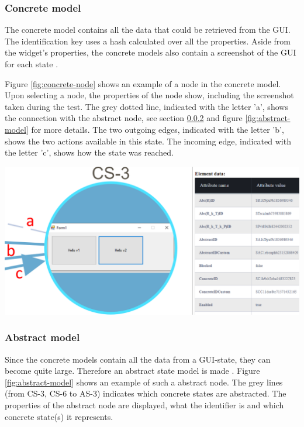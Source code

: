 \subsubsection{Concrete model}
The concrete model contains all the data that could be retrieved from the GUI. The identification key uses a hash calculated over all the properties. Aside from the widget's properties, the concrete models also contain a screenshot of the GUI for each state \cite{thesisMulders}.

Figure \ref{fig:concrete-node} shows an example of a node in the concrete model. Upon selecting a node, the properties of the node show, including the screenshot taken during the test. The grey dotted line, indicated with the letter 'a', shows the connection with the abstract node, see section \ref{abstract-model} and figure \ref{fig:abstract-model} for more details. The two outgoing edges, indicated with the letter 'b', shows the two actions available in this state. The incoming edge, indicated with the letter 'c', shows how the state was reached. 

\bigskip
\begingroup
\captionsetup{type=figure}
\includegraphics[scale=0.5]{images/concrete-model.png}
\label{fig:concrete-node}
\endgroup

\newpage
\subsubsection{Abstract model} \label{abstract-model}
Since the concrete models contain all the data from a GUI-state, they can become quite large.  Therefore an abstract state model is made \cite{thesisMulders}. Figure \ref{fig:abstract-model} shows an example of such a abstract node. The grey lines (from CS-3, CS-6 to AS-3) indicates which concrete states are abstracted. The properties of the abstract node are displayed, what the identifier is and which concrete state(s) it represents.

